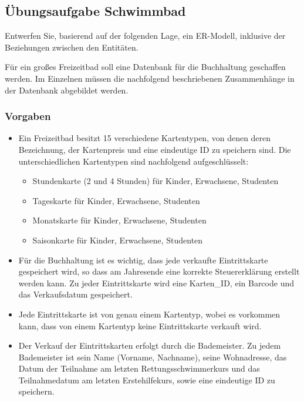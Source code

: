       \subsection{Übungsaufgabe Schwimmbad}
        Entwerfen Sie, basierend auf der folgenden Lage, ein ER-Modell, inklusive der Beziehungen zwischen den Entitäten.

        Für ein groß{}es Freizeitbad soll eine Datenbank für die Buchhaltung geschaffen werden. Im Einzelnen müssen die nachfolgend beschriebenen Zusammenhänge in der Datenbank abgebildet werden.

        \subsubsection{Vorgaben}
          \begin{itemize}
            \item Ein Freizeitbad besitzt 15 verschiedene Kartentypen, von denen deren Bezeichnung, der
            Kartenpreis und eine eindeutige ID zu speichern sind. Die unterschiedlichen Kartentypen sind nachfolgend aufgeschlüsselt:
              \begin{itemize}
                \item Stundenkarte (2 und 4 Stunden) für Kinder, Erwachsene, Studenten
                \item Tageskarte für Kinder, Erwachsene, Studenten
                \item Monatskarte für Kinder, Erwachsene, Studenten
                \item Saisonkarte für Kinder, Erwachsene, Studenten
              \end{itemize}
            \item Für die Buchhaltung ist es wichtig, dass jede verkaufte Eintrittskarte gespeichert wird, so
            dass am Jahresende eine korrekte Steuererklärung erstellt werden kann. Zu jeder Eintrittskarte wird
            eine Karten\_ID, ein Barcode und das Verkaufsdatum gespeichert.
            \item Jede Eintrittskarte ist von genau einem Kartentyp, wobei es vorkommen kann, dass von einem Kartentyp keine Eintrittskarte verkauft wird.
            \item Der Verkauf der Eintrittskarten erfolgt durch die Bademeister. Zu jedem Bademeister ist
            sein Name (Vorname, Nachname), seine Wohnadresse, das Datum der Teilnahme am letzten Rettungsschwimmerkurs und das Teilnahmedatum am letzten Erstehilfekurs, sowie eine eindeutige ID zu speichern.

\end{itemize}
